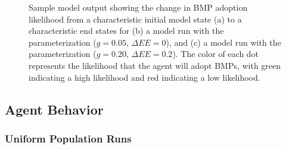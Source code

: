 \begin{figure}
\centering
    \hfill
    \hfill
    \caption{Sample model output showing the change in BMP adoption likelihood
    from a characteristic initial model state (a) to a characteristic end states
    for (b)
    a model run with the parameterization ($g=0.05$, $\Delta EE=0$),
    and (c)
    a model run with the parameterization ($g=0.20$, $\Delta EE=0.2$).
    The color of each dot represents the likelihood that the agent will adopt
    BMPs, with green indicating a high likelihood and red indicating a low
    likelihood.}
    \label{fig:farm_mas}
\end{figure}

\subsection{Agent Behavior}
\label{subsec:farm_results_agents}

\subsubsection{Uniform Population Runs}

